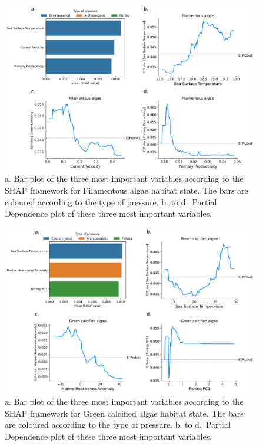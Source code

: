 \begin{figure}
\hypertarget{fig:chap3figS42}{%
\centering
\includegraphics{03-Chapitre3/figures/supplementary/04-pdp_Filamentous algae.png}
\caption{a. Bar plot of the three most important variables according to
the SHAP framework for Filamentous algae habitat state. The bars are
coloured according to the type of pressure. b. to d.~Partial Dependence
plot of these three most important variables.}\label{fig:chap3figS42}
}
\end{figure}

\begin{figure}
\hypertarget{fig:chap3figS43}{%
\centering
\includegraphics{03-Chapitre3/figures/supplementary/04-pdp_Green calcified algae.png}
\caption{a. Bar plot of the three most important variables according to
the SHAP framework for Green calcified algae habitat state. The bars are
coloured according to the type of pressure. b. to d.~Partial Dependence
plot of these three most important variables.}\label{fig:chap3figS43}
}
\end{figure}

